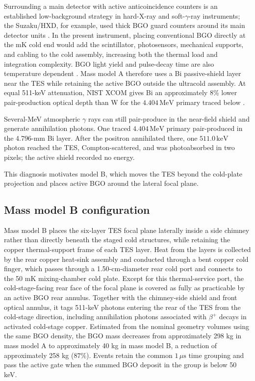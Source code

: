 \documentclass[11pt]{article}
\newcommand{\keV}{\ensuremath{\,\mathrm{keV}}}
\newcommand{\MeV}{\ensuremath{\,\mathrm{MeV}}}
\begin{document}
Surrounding a main detector with active anticoincidence counters is an established low-background strategy in hard-X-ray and soft-$\gamma$-ray instruments; the Suzaku/HXD, for example, used thick BGO guard counters around its main detector units \cite{Takahashi2007HXD}. In the present instrument, placing conventional BGO directly at the mK cold end would add the scintillator, photosensors, mechanical supports, and cabling to the cold assembly, increasing both the thermal load and integration complexity. BGO light yield and pulse-decay time are also temperature dependent \cite{Verdier2011BGO}. Mass model A therefore uses a Bi passive-shield layer near the TES while retaining the active BGO outside the ultracold assembly. At equal 511-keV attenuation, NIST XCOM gives Bi an approximately 8\% lower pair-production optical depth than W for the $4.404\MeV$ primary traced below \cite{NISTXCOM}.

Several-MeV atmospheric $\gamma$ rays can still pair-produce in the near-field
shield and generate annihilation photons. One traced $4.404\MeV$ primary
pair-produced in the 4.796-mm Bi layer. After the positron annihilated there,
one $511.0\keV$ photon reached the TES, Compton-scattered, and was photoabsorbed
in two pixels; the active shield recorded no energy.

This diagnosis motivates model B, which moves the TES beyond the cold-plate
projection and places active BGO around the lateral focal plane.
\endgroup

\FloatBarrier

\subsection{Mass model B configuration}
\label{subsec:optimized_shield_results}

Mass model B places the six-layer TES focal plane laterally inside a side chimney rather than directly beneath the staged cold structures, while retaining the copper thermal-support frame of each TES layer. Heat from the layers is collected by the rear copper heat-sink assembly and conducted through a bent copper cold finger, which passes through a 1.50-cm-diameter rear cold port and connects to the 50 mK mixing-chamber cold plate. Except for this thermal-service port, the cold-stage-facing rear face of the focal plane is covered as fully as practicable by an active BGO rear annulus. Together with the chimney-side shield and front optical annulus, it tags 511-keV photons entering the rear of the TES from the cold-stage direction, including annihilation photons associated with $\beta^+$ decays in activated cold-stage copper. Estimated from the nominal geometry volumes using the same BGO density, the BGO mass decreases from approximately 298 kg in mass model A to approximately 40 kg in mass model B, a reduction of approximately 258 kg ($87\%$). Events retain the common $1\,\mu\mathrm{s}$ time grouping and pass the active gate when the summed BGO deposit in the group is below 50 keV.
\end{document}
